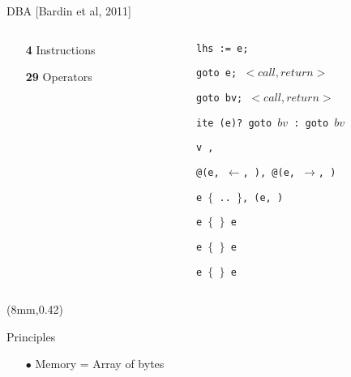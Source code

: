 \begin{frame}{DBA [Bardin et al, 2011]}
     \begin{columns}
     \begin{column}{0.5\linewidth}
     \tiny
     \vspace{-1cm}
     \begin{itemize}
     \item[] {\Huge \bf {\color{blue}4}} {\Large Instructions}
     \vspace{4cm}
     \item[] {\Huge \bf {\color{blue}29}} {\Large Operators}
     \end{itemize}
     \end{column}
     \tiny
     \begin{column}{0.5\linewidth}
     \begin{itemize}
     \item[] \tt lhs := e;
     \item[] \tt goto e; $<call, return>$
     \item[] \tt goto bv; $<call, return>$
     \item[] \tt ite (e)? goto $bv$ : goto $bv$
     \vspace{3cm}
     \item[] \tt v , {\color{red}{bv}}
     \item[] \tt @(e, $\leftarrow$, {\color{blue}{$k$}}), @(e, $\rightarrow$, {\color{blue}{$k$}})
     \item[] \tt e $\lbrace$ {\color{blue}{i}}.. {\color{blue}{j}}$\rbrace$, {}(e, {\color{blue}{$n$}})
     \item[] \tt e $\lbrace$ {} $\rbrace$ e  
     \item[] \tt e $\lbrace$ {} $\rbrace$ e
     \item[] \tt e $\lbrace$ {} $\rbrace$ e
     \end{itemize}
     \end{column}
     \end{columns}
     {\begin{textblock*}{60mm}(8mm,0.42\textheight)
     \begin{blueblock}{Principles}
     \scriptsize
     \begin{itemize}
     \item[$\bullet$] Memory = Array of bytes

\end{itemize}
\end{blueblock}
\end{textblock*}}
\end{frame}
